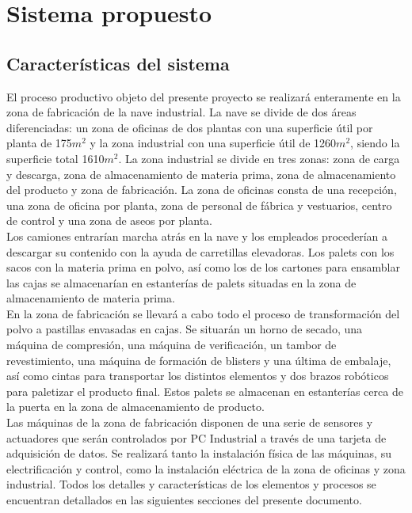 \section{Sistema propuesto}

\subsection{Características del sistema}

El proceso productivo objeto del presente proyecto se realizará enteramente en la zona de fabricación de la nave industrial. La nave se divide de dos áreas diferenciadas: un zona de oficinas de dos plantas con una superficie útil por planta de 175$m^2$ y la zona industrial con una superficie útil de 1260$m^2$, siendo la superficie total 1610${m^2}$. La zona industrial se divide en tres zonas: zona de carga y descarga, zona de almacenamiento de materia prima, zona de almacenamiento del producto y zona de fabricación. La zona de oficinas consta de una recepción, una zona de oficina por planta, zona de personal de fábrica y vestuarios, centro de control y una zona de aseos por planta.
\\

Los camiones entrarían marcha atrás en la nave y los empleados procederían a descargar su contenido con la ayuda de carretillas elevadoras. Los palets con los sacos con la materia prima en polvo, así como los de los cartones para ensamblar las cajas se almacenarían en estanterías de palets situadas en la zona de almacenamiento de materia prima. 
\\

En la zona de fabricación se llevará a cabo todo el proceso de transformación del polvo a pastillas envasadas en cajas. Se situarán un horno de secado, una máquina de compresión, una máquina de verificación, un tambor de revestimiento, una máquina de formación de blisters y una última de embalaje, así como cintas para transportar los distintos elementos y dos brazos robóticos para paletizar el producto final. Estos palets se almacenan en estanterías cerca de la puerta en la zona de almacenamiento de producto.\\

Las máquinas de la zona de fabricación disponen de una serie de sensores y actuadores que serán controlados por PC Industrial a través de una tarjeta de adquisición de datos. Se realizará tanto la instalación física de las máquinas, su electrificación y control, como la instalación eléctrica de la zona de oficinas y zona industrial. Todos los detalles y características de los elementos y procesos se encuentran detallados en las siguientes secciones del presente documento.

